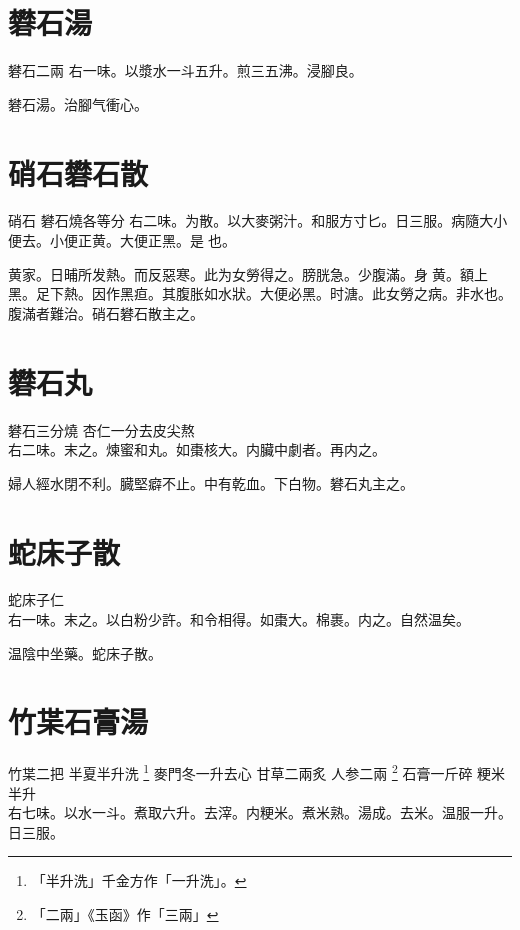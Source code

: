 \section{礬石湯}

礬石{\scriptsize 二兩} 
右一味。以漿水一斗五升。煎三五沸。浸腳良。

礬石湯。治腳气衝心。

\section{硝石礬石散}

硝石{ }礬石{\scriptsize 燒各等分} 
右二味。为散。以大麥粥汁。和服方寸匕。日三服。病隨大小便去。小便正黄。大便正黑。是{\sungtpii 𠊱}也。

黄家。日晡所发熱。而反惡寒。此为女勞得之。膀胱急。少腹滿。身{\sungtpii 𥁞}黄。額上黑。足下熱。因作黑疸。其腹胀如水狀。大便必黑。时溏。此女勞之病。非水也。腹滿者難治。硝石礬石散主之。

\section{礬石丸}

礬石{\scriptsize 三分燒} 杏仁{\scriptsize 一分去皮尖熬}\\
右二味。末之。煉蜜和丸。如棗核大。内臟中劇者。再内之。

婦人經水閉不利。臓堅癖不止。中有乾血。下白物。礬石丸主之。

\section{蛇床子散}

蛇床子仁\\
右一味。末之。以白粉少許。和令相得。如棗大。棉裹。内之。自然温矣。

温陰中坐藥。蛇床子散。

\section{竹枼石膏湯}

竹枼{\scriptsize 二把} 半夏{\scriptsize 半升洗
	\footnote{
		「半升洗」千金方作「一升洗」。
	}
} 麥門冬{\scriptsize 一升去心} 甘草{\scriptsize 二兩炙} 人参{\scriptsize 二兩
	\footnote{
		「二兩」《玉函》作「三兩」
	}
} 石膏{\scriptsize 一斤碎} 粳米{\scriptsize 半升}\\
右七味。以水一斗。煮取六升。去滓。内粳米。煮米熟。湯成。去米。温服一升。日三服。

